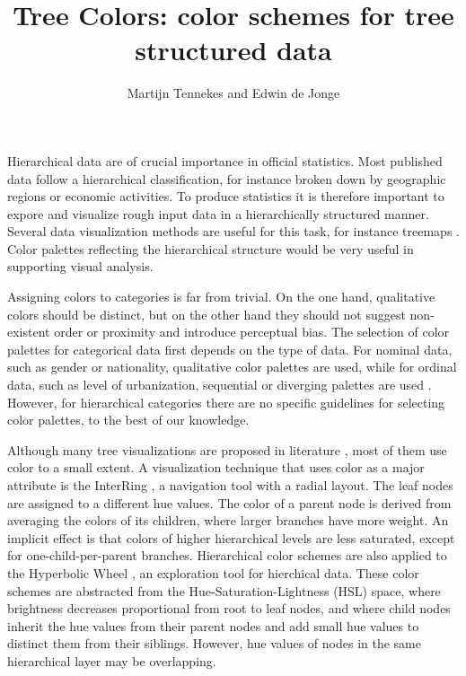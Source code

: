 \documentclass[journal]{vgtc}                %
\title{Tree Colors: color schemes for tree structured data}
\author{Martijn Tennekes and Edwin de Jonge}
\begin{document}
\lstset{language=R}


\maketitle

Hierarchical data are of crucial importance in official statistics. Most published data follow a hierarchical classification, for instance broken down by geographic regions or economic activities. To produce statistics it is therefore important to expore and visualize rough input data in a hierarchically structured manner. Several data visualization methods are useful for this task, for instance treemaps
\cite{shneiderman1992,tennekes2011b}. Color palettes reflecting the hierarchical structure would be very useful in supporting visual analysis.

Assigning colors to categories is far from trivial. On the one hand, qualitative colors should be distinct, but on the other hand they should not suggest non-existent order or proximity and introduce perceptual bias. The selection of color palettes for categorical data first depends on the type of data. For nominal data, such as gender or nationality, qualitative color palettes are used, while for ordinal data, such as level of urbanization, sequential or diverging palettes are used \cite{brewer03, zeileis2009}. However, for hierarchical categories there are no specific guidelines for selecting color palettes, to the best of our knowledge.

Although many tree visualizations are proposed in literature \cite{schulz2011}, most of them use color to a small extent. A visualization technique that uses color as a major attribute is the InterRing \cite{yang2002}, a navigation tool with a radial layout. The leaf nodes are assigned to a different hue values. The color of a parent node is derived from averaging the colors of its children, where larger branches have more weight. An implicit effect is that colors of higher hierarchical levels are less saturated, except for one-child-per-parent branches. Hierarchical color schemes are also applied to the Hyperbolic Wheel \cite{lam2012}, an exploration tool for hierchical data.  These color schemes are abstracted from the Hue-Saturation-Lightness (HSL) space, where brightness decreases proportional from root to leaf nodes, and where child nodes inherit the hue values from their parent nodes and add small hue values to distinct them from their siblings. However, hue values of nodes in the same hierarchical layer may be overlapping.
\end{document}

